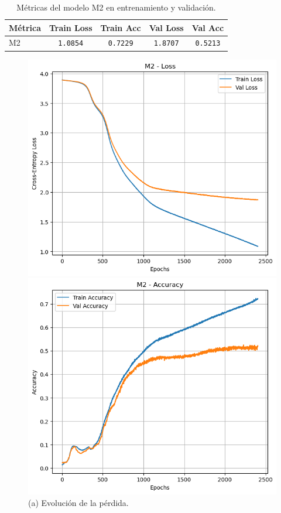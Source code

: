 \documentclass[11pt]{article}
\begin{document}
\begin{table}[H]
    \centering
    \begin{tabular}{lcccc}
        \hline
        Métrica & Train Loss & Train Acc & Val Loss & Val Acc \\
        \hline
        M2 & \texttt{1.0854} & \texttt{0.7229} & \texttt{1.8707} & \texttt{0.5213} \\
        \hline
    \end{tabular}
    \caption{Métricas del modelo M2 en entrenamiento y validación.}
    \label{tab:metrics-m2}
\end{table}

\begin{figure}[H]
    \centering
    \begin{minipage}[t]{0.32\textwidth}
        \centering
        \includegraphics[width=\linewidth]{figures/loss_m2.png}
        \caption*{(a) Evolución de la pérdida.}
    \end{minipage}
    \hfill
    \begin{minipage}[t]{0.32\textwidth}
        \centering
        \includegraphics[width=\linewidth]{figures/acc_m2.png}

\end{minipage}
\end{figure}
\end{document}

